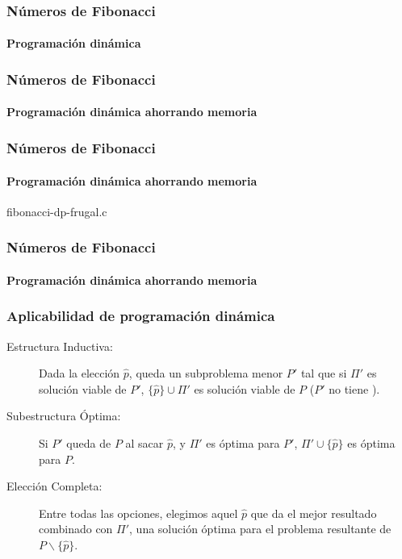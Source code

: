 \documentclass[english, spanish, fleqn,%
hyperref = {colorlinks, urlcolor = blue}%
]{beamer}
\begin{document}
\begin{frame}
  \setcounter{beamerpauses}{2}
  \frametitle{Números de Fibonacci}
  \framesubtitle{Programación dinámica}

\end{frame}

\begin{frame}
  \setcounter{beamerpauses}{2}
  \frametitle{Números de Fibonacci}
  \framesubtitle{Programación dinámica ahorrando memoria}

\end{frame}

\begin{frame}
  \frametitle{Números de Fibonacci}
  \framesubtitle{Programación dinámica ahorrando memoria}

  
                  {fibonacci-dp-frugal.c}
\end{frame}

\begin{frame}
  \setcounter{beamerpauses}{2}
  \frametitle{Números de Fibonacci}
  \framesubtitle{Programación dinámica ahorrando memoria}

\end{frame}

\begin{frame}
  \setcounter{beamerpauses}{2}
  \frametitle{Aplicabilidad de programación dinámica}

  \begin{description}
  \item[Estructura Inductiva:]
    Dada la elección \(\widehat{p}\),
    queda un subproblema menor \(P'\)
    tal que si \(\Pi'\) es solución viable de \(P'\),
    \(\{\widehat{p}\} \cup \Pi'\) es solución viable de \(P\)
    (\(P'\) no tiene ).
  \item[Subestructura Óptima:]
    Si \(P'\) queda de \(P\) al sacar \(\hat p\),
    y  \(\Pi'\) es óptima para \(P'\),
    \(\Pi' \cup \{ \widehat{p} \}\) es óptima para \(P\).
  \item[Elección Completa:]
    Entre todas las opciones,
    elegimos aquel \(\widehat{p}\) que da el mejor resultado
    combinado con \(\Pi'\),
    una solución óptima para el problema resultante
    de \(P \smallsetminus \{ \widehat{p} \}\).
  \end{description}
\end{frame}
\end{document}
